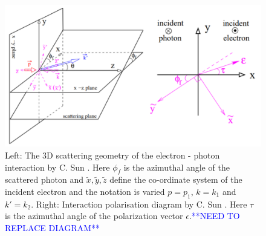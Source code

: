 \documentclass[../main.tex]{subfiles}
\begin{document}
\begin{figure}[!h]
\centering
\includegraphics[width=\textwidth]{Figures/Photon_Production_by_Inverse_Compton_Scattering/SunPolarisationScatteringDiagram.pdf}
\caption{Left: The 3D scattering geometry of the electron - photon interaction by C. Sun \cite{sun2009characterizations}. Here $\phi_{f}$ is the azimuthal angle of the scattered photon and $\tilde{x}, \tilde{y}, \tilde{z}$ define the co-ordinate system of the incident electron and the notation is varied $p = p_{1}$, $k = k_{1}$ and $k' = k_{2}$. Right: Interaction polarisation diagram by C. Sun \cite{sun2009characterizations}. Here $\tau$ is the azimuthal angle of the polarization vector $\epsilon$.\textcolor{blue}{**NEED TO REPLACE DIAGRAM**}}
\label{fig:sun_geometry}
\end{figure}
\end{document}
